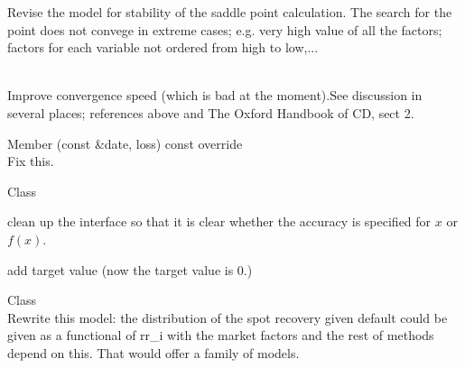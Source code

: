 \begin{DoxyRefList}
Revise the model for stability of the saddle point calculation. The search for the point does not convege in extreme cases; e.\+g. very high value of all the factors; factors for each variable not ordered from high to low,...  
\item[Member \doxylink{class_quant_lib_1_1_saddle_point_loss_model_a65cf83c7daa2c2b91bab3a4e99293259}{Quant\+Lib\+::Saddle\+Point\+Loss\+Model\texorpdfstring{$<$}{<} CP \texorpdfstring{$>$}{>}\+::find\+Saddle} (const std\+::vector$<$ Real $>$ \&inv\+Uncond\+Probs, \doxylink{namespace_quant_lib_a372ac5c1a422a6b276fe0552d4d83f50}{Real} loss\+Level, const std\+::vector$<$ Real $>$ \&mkt\+Factor, \doxylink{namespace_quant_lib_a372ac5c1a422a6b276fe0552d4d83f50}{Real} accuracy=1.\+0e-\/3, \doxylink{namespace_quant_lib_a9adc2615d630d6006896b3402b09b03b}{Natural} max\+Evaluations=50) const]\hfill \\
\label{todo__todo000021}%
%
Improve convergence speed (which is bad at the moment).See discussion in several places; references above and The Oxford Handbook of CD, sect 2.  
\item[Member \doxylink{class_quant_lib_1_1_saddle_point_loss_model_a043e0d936e5422163114204e5d3d15b4}{Quant\+Lib\+::Saddle\+Point\+Loss\+Model\texorpdfstring{$<$}{<} CP \texorpdfstring{$>$}{>}\+::split\+Va\+RLevel} (const \doxylink{class_quant_lib_1_1_date}{Date} \&date, \doxylink{namespace_quant_lib_a372ac5c1a422a6b276fe0552d4d83f50}{Real} loss) const override]\hfill \\
\label{todo__todo000022}%
%
Fix this.  
\item[Class \doxylink{class_quant_lib_1_1_solver1_d}{Quant\+Lib\+::Solver1D\texorpdfstring{$<$}{<} Impl \texorpdfstring{$>$}{>}} ]\hfill \\
\label{todo__todo000051}%
%

\begin{DoxyItemize}
\item clean up the interface so that it is clear whether the accuracy is specified for $ x $ or $ f(x) $.
\item add target value (now the target value is 0.) 
\end{DoxyItemize}
\item[Class \doxylink{class_quant_lib_1_1_spot_recovery_latent_model}{Quant\+Lib\+::Spot\+Recovery\+Latent\+Model\texorpdfstring{$<$}{<} copula\+Policy \texorpdfstring{$>$}{>}} ]\hfill \\
\label{todo__todo000023}%
%
Rewrite this model\+: the distribution of the spot recovery given default could be given as a functional of rr\+\_\+i with the market factors and the rest of methods depend on this. That would offer a family of models. 




\end{DoxyRefList}
